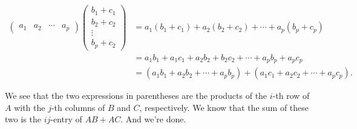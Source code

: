 \documentclass[12pt]{article}
\begin{document}
\begin{align*}
\begin{pmatrix} a_1 & a_2 & \cdots & a_p \end{pmatrix} \begin{pmatrix} b_1 + c_1 \\ b_2 +c_2 \\ \vdots \\ b_p + c_2 \end{pmatrix} &=
a_1(b_1 + c_1) + a_2(b_2 + c_2) + \cdots + a_p(b_p + c_p) \\
&= a_1 b_1 + a_1 c_1 + a_2 b_2 + b_2 c_2 + \cdots + a_p b_p + a_p c_p \\[.05in]
&= (a_1 b_1 + a_2 b_2 + \cdots + a_p b_p) + (a_1 c_1 + a_2 c_2 + \cdots +  a_p c_p). 
\end{align*}

\noindent
We see that the two expressions in parentheses are the products of the $i$-th row of $A$ with the $j$-th columns of $B$ and $C$, respectively. We know that the sum of these two is the $ij$-entry of $AB + AC$. And we're done.
\end{document}
